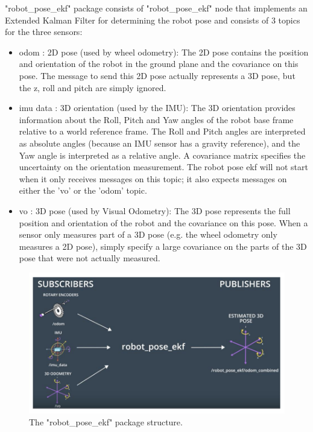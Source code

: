 "robot\_pose\_ekf" package consists of "robot\_pose\_ekf" node that implements an Extended Kalman Filter for determining the robot pose and consists of 3 topics for the three sensors:
\begin{itemize}
    \item odom : 2D pose (used by wheel odometry): The 2D pose contains the position and orientation of the robot in the ground plane and the covariance on this pose. The message to send this 2D pose actually represents a 3D pose, but the z, roll and pitch are simply ignored.
    \item imu data : 3D orientation (used by the IMU): The 3D orientation provides information about the Roll, Pitch and Yaw angles of the robot base frame relative to a world reference frame. The Roll and Pitch angles are interpreted as absolute angles (because an IMU sensor has a gravity reference), and the Yaw angle is interpreted as a relative angle. A covariance matrix specifies the uncertainty on the orientation measurement. The robot pose ekf will not start when it only receives messages on this topic; it also expects messages on either the 'vo' or the 'odom' topic.
    \item vo : 3D pose (used by Visual Odometry): The 3D pose represents the full position and orientation of the robot and the covariance on this pose. When a sensor only measures part of a 3D pose (e.g. the wheel odometry only measures a 2D pose), simply specify a large covariance on the parts of the 3D pose that were not actually measured.\cite{web036}
\end{itemize}

 \begin{figure}[H]%
    \center%
    \includegraphics[width=.9\textwidth]{images/Alaa/rosPackage.JPG}%
    \caption[robot pose ekf packge]{The "robot\_pose\_ekf" package structure.}\label{fig: robot pose ekf packge}%
  \end{figure}
  
